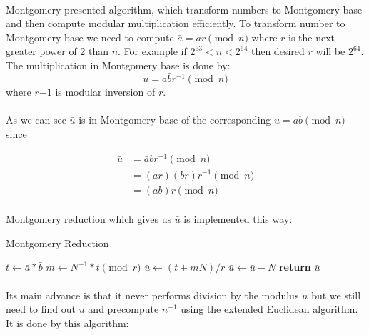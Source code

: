 \documentclass[thesis=B,english]{FITthesis}[2012/10/20]
\begin{document}
{\paragraph*{}{
Montgomery presented algorithm, which transform numbers to Montgomery base and then compute modular multiplication efficiently.
To transform number to Montgomery base we need to compute \(\bar{a} = ar \pmod{n}\) where \(r\) is the next greater power of 2 than \(n\). For example if \(2^{63} < n < 2^{64}\) 
then desired \(r\) will be \(2^{64}\). The multiplication in Montgomery base is done by: \[\bar{u} = \bar{a}\bar{b}r^{-1} \pmod{n}\] where \(r{-1}\) is modular inversion of \(r\).
}
\paragraph*{}{
As we can see \(\bar{u}\) is in Montgomery base of the corresponding 
\(u = ab \pmod{n}\) 
since}

\begin{equation}
\begin{split}
\bar{u} & = \bar{a}\bar{b}r^{-1} \pmod{n} \\
 & = (ar)(br)r^{-1} \pmod{n} \\
 & = (ab)r \pmod{n}
\end{split}
\end{equation}
\medskip

\paragraph*{}{
Montgomery reduction which gives us \(\bar{u}\) is implemented this way:
}

\begin{algorithm}[H]
\caption{Montgomery Reduction}
\begin{algorithmic}[1]
 \State $t \gets\bar{a} *\bar{b}$
 \State $m \gets N^{-1} * t \pmod{r}$
 \State $\bar{u} \gets (t + mN) / r$
  \State $\bar{u} \gets\bar{u} - N$
 \EndIf
\State \textbf{return} $\bar{u}$
\EndFunction
\end{algorithmic}
\end{algorithm}

\paragraph*{}
{
Its main advance is that it never performs division by the modulus \(n\) but we still need to find out \(u\) and precompute \(n^{-1}\) using the extended Euclidean algorithm.
It is done by this algorithm: }

}
\end{document}
